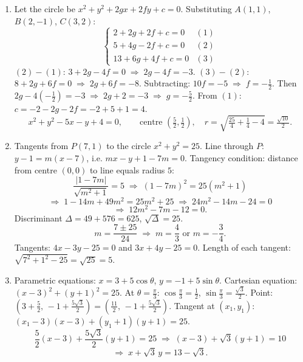 \documentclass[11pt]{article}
\begin{document}
\begin{corrige}
\begin{enumerate}
\item Let the circle be $x^{2}+y^{2}+2gx+2fy+c=0$. Substituting $A(1,1)$, $B(2,-1)$, $C(3,2)$:
\[
\begin{cases}
2+2g+2f+c=0 & (1)\\
5+4g-2f+c=0 & (2)\\
13+6g+4f+c=0 & (3)
\end{cases}
\]
$(2)-(1)$: $3+2g-4f=0 \;\Longrightarrow\; 2g-4f=-3$. \quad $(3)-(2)$: $8+2g+6f=0 \;\Longrightarrow\; 2g+6f=-8$.
Subtracting: $10f=-5 \;\Longrightarrow\; f=-\frac{1}{2}$.
Then $2g-4(-\frac{1}{2})=-3 \;\Longrightarrow\; 2g+2=-3 \;\Longrightarrow\; g=-\frac{5}{2}$.
From $(1)$: $c=-2-2g-2f = -2+5+1=4$.
\[
\boxed{x^{2}+y^{2}-5x-y+4=0},\qquad \text{centre } \left(\tfrac{5}{2},\tfrac{1}{2}\right),\quad r=\sqrt{\tfrac{25}{4}+\tfrac{1}{4}-4}=\tfrac{\sqrt{10}}{2}.
\]
\item Tangents from $P(7,1)$ to the circle $x^{2}+y^{2}=25$.
Line through $P$: $y-1=m(x-7)$, i.e. $mx-y+1-7m=0$.
Tangency condition: distance from centre $(0,0)$ to line equals radius $5$:
\[
\frac{|1-7m|}{\sqrt{m^{2}+1}}=5 \;\Longrightarrow\; (1-7m)^{2}=25(m^{2}+1)
\]
\[
\Longrightarrow\; 1-14m+49m^{2}=25m^{2}+25 \;\Longrightarrow\; 24m^{2}-14m-24=0
\]
\[
\Longrightarrow\; 12m^{2}-7m-12=0.
\]
Discriminant $\Delta = 49+576=625$, $\sqrt{\Delta}=25$.
\[
m=\frac{7\pm 25}{24} \;\Longrightarrow\; m=\frac{4}{3} \text{ or } m=-\frac{3}{4}.
\]
Tangents: $4x-3y-25=0$ and $3x+4y-25=0$.
Length of each tangent: $\sqrt{7^{2}+1^{2}-25}=\sqrt{25}=5$.
\item Parametric equations: $x=3+5\cos\theta$, $y=-1+5\sin\theta$.
Cartesian equation: $(x-3)^{2}+(y+1)^{2}=25$.
At $\theta=\frac{\pi}{3}$: $\cos\frac{\pi}{3}=\frac{1}{2}$, $\sin\frac{\pi}{3}=\frac{\sqrt{3}}{2}$.
Point: $\left(3+\frac{5}{2},\,-1+\frac{5\sqrt{3}}{2}\right)=\left(\frac{11}{2},\,-1+\frac{5\sqrt{3}}{2}\right)$.
Tangent at $(x_{1},y_{1})$: $(x_{1}-3)(x-3)+(y_{1}+1)(y+1)=25$.
\[
\frac{5}{2}(x-3)+\frac{5\sqrt{3}}{2}(y+1)=25 \;\Longrightarrow\; (x-3)+\sqrt{3}(y+1)=10
\]
\[
\Longrightarrow\; x+\sqrt{3}\,y = 13-\sqrt{3}.
\]
\end{enumerate}
\end{corrige}
\end{document}
